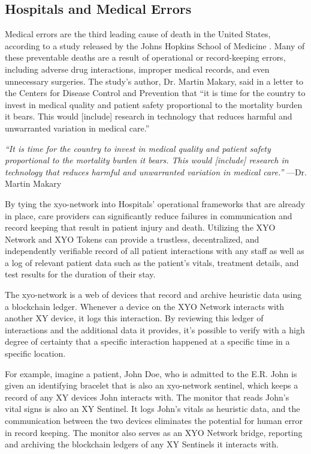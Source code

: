 \documentclass{article}
\begin{document}
\subsection{Hospitals and Medical Errors}
Medical errors are the third leading cause of death in the United States, according to a study released by the Johns Hopkins School of Medicine \cite{sternberg-medicalerrors}. Many of these preventable deaths are a result of operational or record-keeping errors, including adverse drug interactions, improper medical records, and even unnecessary surgeries. The study's author, Dr. Martin Makary, said in a letter to the Centers for Disease Control and Prevention that ``it is time for the country to invest in medical quality and patient safety proportional to the mortality burden it bears. This would [include] research in technology that reduces harmful and unwarranted variation in medical care.''

\begin{displayquote}\textit{``It is time for the country to invest in medical quality and patient safety proportional to the mortality burden it bears. This would [include] research in technology that reduces harmful and unwarranted variation in medical care.''}
\vspace{2mm}
---Dr. Martin Makary
\end{displayquote}

By tying the \Gls{xyo-network} into Hospitals' operational frameworks that are already in place, care providers can significantly reduce failures in communication and record keeping that result in patient injury and death. Utilizing the XYO Network and XYO Tokens can provide a trustless, decentralized, and independently verifiable record of all patient interactions with any staff as well as a log of relevant patient data such as the patient's vitals, treatment details, and test results for the duration of their stay.

The \Gls{xyo-network} is a web of devices that record and archive \gls{heuristic} data using a blockchain ledger. Whenever a device on the XYO Network interacts with another XY device, it logs this interaction. By reviewing this ledger of interactions and the additional data it  provides, it's possible to verify with a high degree of \gls{certainty} that a specific interaction happened at a specific time in a specific location.

For example, imagine a patient, John Doe, who is admitted to the E.R. John is given an identifying bracelet that is also an \Gls{xyo-network} \Gls{sentinel}, which keeps a record of any XY devices John interacts with. The monitor that reads John's vital signs is also an XY Sentinel. It logs John's vitals as heuristic data, and the communication between the two devices eliminates the potential for human error in record keeping. The monitor also serves as an XYO Network \Gls{bridge}, reporting and archiving the blockchain ledgers of any XY Sentinels it interacts with.
\end{document}
